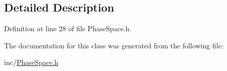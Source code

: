 \subsection{Detailed Description}


Definition at line 28 of file Phase\-Space.\-h.



The documentation for this class was generated from the following file\-:\begin{DoxyCompactItemize}
\item 
inc/\hyperlink{PhaseSpace_8h}{Phase\-Space.\-h}\end{DoxyCompactItemize}
